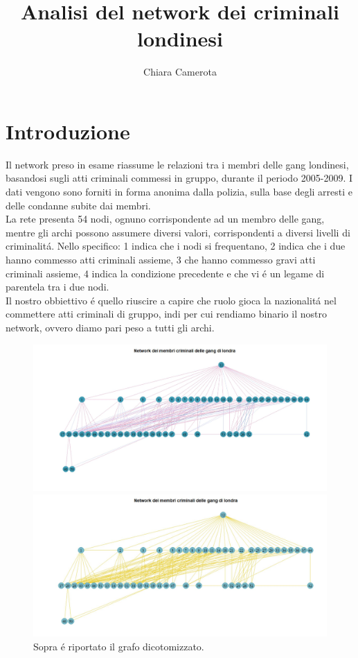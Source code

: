 \documentclass[11pt,a4paper]{report}
\author{Chiara Camerota}
\title{Analisi del network dei criminali londinesi}
\begin{document}
	\maketitle
\chapter*{Introduzione}
Il network preso in esame riassume le relazioni tra i membri delle gang londinesi, basandosi sugli atti criminali commessi in gruppo, durante il periodo 2005-2009. I dati vengono sono forniti in forma anonima dalla polizia, sulla base degli arresti e delle condanne subite dai membri. 
 \\
La rete presenta 54 nodi, ognuno corrispondente ad un membro delle gang, mentre gli archi possono assumere diversi valori, corrispondenti a diversi livelli di criminalit\'a. Nello specifico: 1 indica che i nodi si frequentano, 2 indica che i due hanno commesso atti criminali assieme, 3 che hanno commesso gravi atti criminali assieme, 4 indica la condizione precedente e che vi \'e un legame di parentela tra i due nodi.
\\
Il nostro obbiettivo \'e quello riuscire a capire che ruolo gioca la nazionalit\'a nel commettere atti criminali di gruppo, indi per cui rendiamo binario il nostro network, ovvero diamo pari peso a tutti gli archi.
\\
\begin{figure}[H]
	\centering
		\includegraphics[scale =0.5]{networkviola}
	\caption{Sopra \'e riportato il grafo originale, ogni colore indica un legame diverso tra le unit\'a. Il rosa indica un arco di tipo 1, il blu cobalto chiaro un legame di tipo 2, il marrone uno di tipo 3, il blu cobalto scuro un legame di tipo 4 .Come si pu\'o osservare, il grafo presenta una struttura piramidale, tipica delle organizzazioni criminali.}
	\includegraphics[scale =0.5]{networkbinary}
	\caption{Sopra \'e riportato il grafo dicotomizzato.}

\end{figure}
\end{document}
